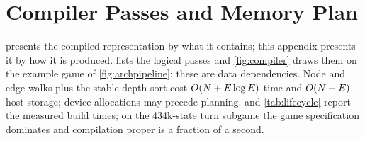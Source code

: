 \section{Compiler Passes and Memory Plan}
\label{app:compiler}

 presents the compiled representation by what it contains;
this appendix presents it by how it is produced.  lists the
logical passes and \cref{fig:compiler} draws them on the example game of
\cref{fig:archpipeline}; these are data dependencies.
Node and edge walks plus the stable depth sort cost
$O(N + E \log E)$ time and $O(N + E)$
host storage; device allocations may precede planning.  and
\cref{tab:lifecycle} report the measured build times; on the 434k-state turn
subgame the game specification dominates and compilation proper is a fraction
of a second.

